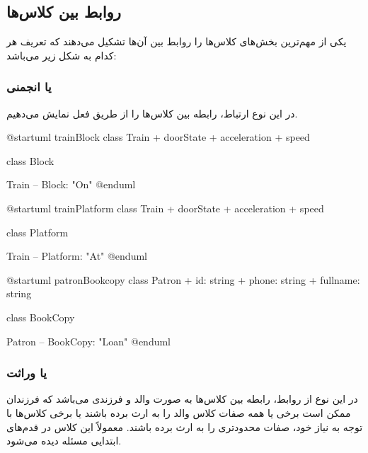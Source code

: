 \subsection{روابط بین کلاس‌ها}

یکی از مهم‌ترین بخش‌های کلاس‌ها را روابط بین آن‌ها تشکیل می‌دهند که تعریف هر
کدام به شکل زیر می‌باشد:

\subsubsection{ یا انجمنی}

در این نوع ارتباط، رابطه بین کلاس‌ها را از طریق فعل نمایش می‌دهیم.

@startuml trainBlock
class Train {
  + doorState
  + acceleration
  + speed
}

class Block { }

Train -- Block: "On"
@enduml

@startuml trainPlatform
class Train {
  + doorState
  + acceleration
  + speed
}

class Platform { }

Train -- Platform: "At"
@enduml

@startuml patronBookcopy
class Patron {
 + id: string
 + phone: string
 + fullname: string
}

class BookCopy {  }

Patron -- BookCopy: "Loan"
@enduml



\subsubsection{ یا وراثت}

در این نوع از روابط، رابطه بین کلاس‌ها به صورت والد و فرزندی می‌باشد که فرزندان
ممکن است برخی یا همه صفات کلاس والد را به ارث برده باشند یا برخی کلاس‌ها با توجه
به نیاز خود، صفات محدودتری را به ارث برده باشند. معمولاً این کلاس در قدم‌های
ابتدایی مسئله دیده می‌شود.

